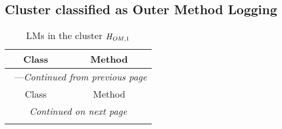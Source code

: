 \subsection{Cluster classified as Outer Method Logging}

\begin{center}
\begin{longtable}{ll}
\caption{LMs in the cluster $\mathit{H}_{\mathit{OM},1}$}\\
\toprule\multicolumn{1}{c}{Class}&\multicolumn{1}{c}{Method}\\\midrule
\endfirsthead

\multicolumn{2}{c}{\tablename\ \thetable{}---\textit{Continued from previous page}} \\\midrule
\multicolumn{1}{c}{Class}&\multicolumn{1}{c}{Method}\\\midrule
\endhead
\multicolumn{2}{c}{\textit{Continued on next page}}\\\midrule
\endfoot
\bottomrule
\endlastfoot


\end{longtable}
\end{center}
